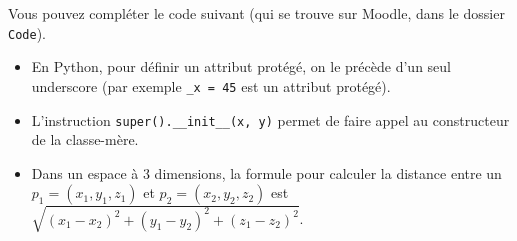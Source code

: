 \begin{Exercice}[15 minutes]
    Vous pouvez compléter le code suivant (qui se trouve sur Moodle, dans le dossier \lstinline{Code}).
     
    
    \begin{conseil}
        \begin{itemize}
            \item En Python, pour définir un attribut protégé, on le précède d'un seul underscore (par exemple \lstinline{_x = 45} est un attribut protégé).
            \item L'instruction \lstinline{super().__init__(x, y)} permet de faire appel au constructeur de la classe-mère.
            \item Dans un espace à 3 dimensions, la formule pour calculer la distance entre un $p_1 = (x_1, y_1, z_1)$ et $p_2 = (x_2, y_2, z_2)$ est $\sqrt{(x_1 - x_2)^2 + (y_1 - y_2)^2 + (z_1 - z_2)^2}$.
        \end{itemize}
    \end{conseil}
    \begin{solution}
     
    \end{solution}
    \end{Exercice} 


